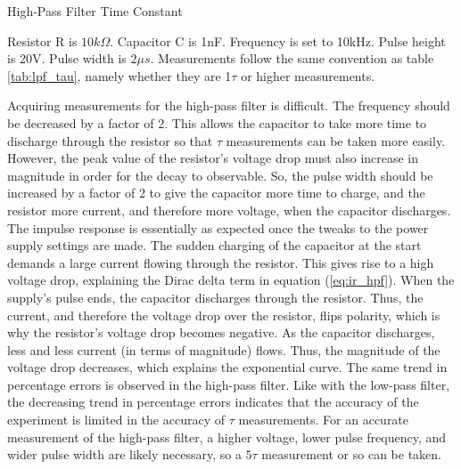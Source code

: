 \FloatBarrier

\begin{table}[h!]
\centering
\caption{High-Pass Filter Time Constant}
\label{tab:hpf_tau}
\end{table}
{\footnotesize Resistor R is $10k\Omega$. Capacitor C is 1nF. Frequency is set to 10kHz. Pulse height is 20V. Pulse width is $2\mu s$. Measurements follow the same convention as table \ref{tab:lpf_tau}, namely whether they are 1$\tau$ or higher measurements.} \\
\FloatBarrier

Acquiring measurements for the high-pass filter is difficult. The frequency should be decreased by a factor of 2. This allows the capacitor to take more time to discharge through the resistor so that $\tau$ measurements can be taken more easily. However, the peak value of the resistor's voltage drop must also increase in magnitude in order for the decay to observable. So, the pulse width should be increased by a factor of 2 to give the capacitor more time to charge, and the resistor more current, and therefore more voltage, when the capacitor discharges.
The impulse response is essentially as expected once the tweaks to the power supply settings are made. The sudden charging of the capacitor at the start demands a large current flowing through the resistor. This gives rise to a high voltage drop, explaining the Dirac delta term in equation (\ref{eq:ir_hpf}).
When the supply's pulse ends, the capacitor discharges through the resistor. Thus, the current, and therefore the voltage drop over the resistor, flips polarity, which is why the resistor's voltage drop becomes negative. As the capacitor discharges, less and less current (in terms of magnitude) flows. Thus, the magnitude of the voltage drop decreases, which explains the exponential curve.
The same trend in percentage errors is observed in the high-pass filter. Like with the low-pass filter, the decreasing trend in percentage errors indicates that the accuracy of the experiment is limited in the accuracy of $\tau$ measurements. For an accurate measurement of the high-pass filter, a higher voltage, lower pulse frequency, and wider pulse width are likely necessary, so a $5\tau$ measurement or so can be taken.
